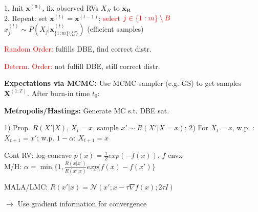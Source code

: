 1. Init $\mathbf{x^{(0)}}$, fix observed RVs $X_B$ to $\mathbf{x_B}$\\
2. Repeat: set $\mathbf{x}^{(t)} = \mathbf{x}^{(t-1)}$; \textcolor{red}{select} $\textcolor{red}{j \in \{1:m\} \setminus B}$\\
$x_j^{(t)} \sim P \left(X_j | \mathbf{x}^{(t)}_{\{1:m\} \setminus \{j\}}\right)$ (efficient samples)

\vspace*{-0.5mm}
\textcolor{red}{Random Order:} \; fulfills DBE, find correct distr.

\textcolor{red}{Determ. Order:} \; not fulfill DBE, still correct distr.

\textbf{Expectations via MCMC:} \; Use MCMC sampler (e.g. GS) to get samples $\mathbf{X}^{(1:T)}$. After burn-in time $t_0$: \;

\textbf{Metropolis/Hastings:} \; Generate MC s.t. DBE sat.

1) Prop. $R(X' | X)$, $X_t = x$, sample $x' \sim R(X' | X=x)$; 
2) For $X_t = x$, w.p. : $X_{t+1} = x'$; w.p. $1 - \alpha$: $X_{t+1} = x$

\vspace*{-0.5mm}
Cont RV: log-concave $p(x) = \frac{1}{Z} exp(-f(x))$, $f$ cnvx \\
M/H: \; $\alpha = \min \{ 1, \frac{R(x|x')}{R(x'|x)}exp(f(x) - f(x')\}$

\vspace*{-0.5mm}
MALA/LMC: \; $R(x' | x) = \mathcal{N}(x'; x - \tau \nabla f(x); 2\tau I)$

$\rightarrow$ Use gradient information for convergence
